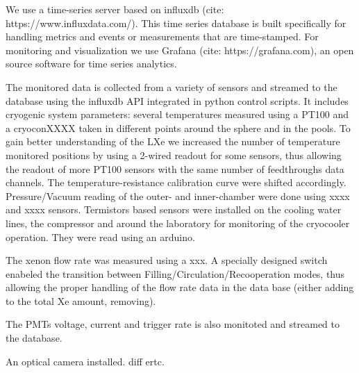 
We use a time-series server based on influxdb (cite: https://www.influxdata.com/). This time series database is built specifically for handling metrics and events or measurements that are time-stamped. 
For monitoring and visualization we use  
Grafana (cite: https://grafana.com), an open source software for time series analytics. 

The monitored data is collected from a variety of sensors and streamed to the database using the influxdb API integrated in python control scripts.
It includes cryogenic system parameters: several temperatures  measured using a PT100 and a cryoconXXXX taken in different points around the sphere 
and in the pools. To gain better understanding of the LXe we increased the number of temperature monitored positions by using a 2-wired 
readout for some sensors, thus allowing the readout of more PT100 sensors with the same number of feedthroughs data channels.
The temperature-resistance calibration curve were shifted accordingly.   
Pressure/Vacuum reading of the outer- and inner-chamber were done using xxxx and xxxx sensors. 
Termistors based sensors were installed on the cooling water lines, the compressor and around the laboratory for monitoring of the cryocooler operation. They were read using an arduino. 

The xenon flow rate was measured using a xxx. A specially designed switch enabeled the transition between Filling/Circulation/Recooperation modes, thus 
allowing the proper handling of the flow rate data in the data base (either adding to the total Xe amount, removing).


The PMTs voltage, current and trigger rate is also monitoted and streamed to the database. 

An optical camera installed. diff ertc.


